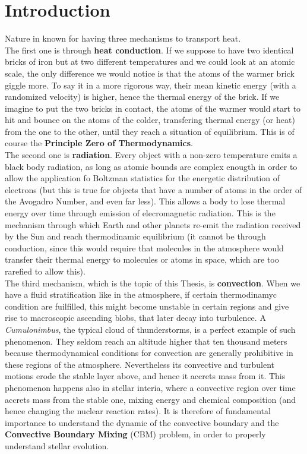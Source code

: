\documentclass[11pt]{article}
\numberwithin{equation}{section}
\begin{document}
\section{Introduction}
Nature in known for having three mechanisms to transport heat.  \\
The first one is through \textbf{heat conduction}. If we suppose to have two identical bricks of iron but at two different temperatures and we could look at an atomic scale, the only difference we would notice is that the atoms of the warmer brick giggle more. To say it in a more rigorous way, their mean kinetic energy (with a randomized velocity) is higher, hence the thermal energy of the brick. If we imagine to put the two bricks in contact, the atoms of the warmer would start to hit and bounce on the atoms of the colder, transfering thermal energy (or heat) from the one to the other, until they reach a situation of equilibrium. This is of course the \textbf{Principle Zero of Thermodynamics}. \\
The second one is \textbf{radiation}. Every object with a non-zero temperature emits a black body radiation, as long as atomic bounds are complex enougth in order to allow the application fo Boltzman statistics for the energetic distribution of electrons (but this is true for objects that have a number of atoms in the order of the Avogadro Number, and even far less). This allows a body to lose thermal energy over time through emission of elecromagnetic radiation. This is the mechanism through which Earth and other planets re-emit the radiation received by the Sun and reach thermodinamic equilibrium (it cannot be through conduction, since this would require that molecules in the atmosphere would transfer their thermal energy to molecules or atoms in space, which are too rarefied to allow this). \\
The third mechanism, which is the topic of this Thesis, is \textbf{convection}. When we have a fluid stratification like in the atmosphere, if certain thermodinamyc condition are fuilfilled, this might become unstable in certain regions and give rise to macroscopic ascending blobs, that later decay into turbulence. A \textit{Cumulonimbus}, the typical cloud of thunderstorms, is a perfect example of such phenomenon. They seldom reach an altitude higher that ten thousand meters because thermodynamical conditions for convection are generally prohibitive in these regions of the atmosphere. Nevertheless its convective and turbulent motions erode the stable layer above, and hence it accrets mass from it. This phenomenon happens also in stellar interia, where a convective region over time accrets mass from the stable one, mixing energy and chemical composition (and hence changing the nuclear reaction rates). It is therefore of fundamental importance to understand the dynamic of the convective boundary and the \textbf{Convective Boundary Mixing} (CBM) problem, in order to properly understand stellar evolution.
\end{document}

